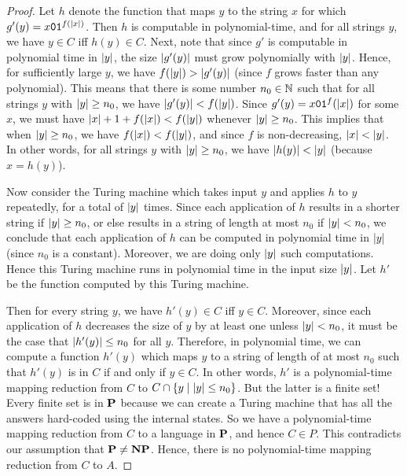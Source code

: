 \documentclass[11pt,twoside=off,numbers=noenddot]{scrbook}
\begin{document}
\begin{proof}
  Let $h$ denote the function that maps $y$ to the string $x$ for which $g'(y) = x\texttt{0}\texttt{1}^{f(| x |)}$. Then $h$ is computable in polynomial-time, and for all strings $y$, we have $y \in C$ iff $h(y) \in C$. Next, note that since $g'$ is computable in polynomial time in $| y |$, the size $| g'(y) |$ must grow polynomially with $| y |$. Hence, for sufficiently large $y$, we have $f(| y |) > | g'(y) |$ (since $f$ grows faster than any polynomial). This means that there is some number $n_0 \in \mathbb N$ such that for all strings $y$ with $| y | \geq n_0$, we have $| g'(y) | < f(| y |)$. Since $g'(y) = x\texttt{0}\texttt{1}^f(| x |)$ for some $x$, we must have $| x | + 1 + f(| x |) < f(| y |)$ whenever $| y | \geq n_0$. This implies that when $| y | \geq n_0$, we have $f(| x |) < f(| y |)$, and since $f$ is non-decreasing, $| x | < | y |$. In other words, for all strings $y$ with $| y | \geq n_0$, we have $| h(y) | < | y |$ (because $x = h(y)$).

  Now consider the Turing machine which takes input $y$ and applies $h$ to $y$ repeatedly, for a total of $| y |$ times. Since each application of $h$ results in a shorter string if $| y | \geq n_0$, or else results in a string of length at most $n_0$ if $| y | < n_0$, we conclude that each application of $h$ can be computed in polynomial time in $| y |$ (since $n_0$ is a constant). Moreover, we are doing only $| y |$ such computations. Hence this Turing machine runs in polynomial time in the input size $| y |$. Let $h'$ be the function computed by this Turing machine.

  Then for every string $y$, we have $h'(y) \in C$ iff $y \in C$. Moreover, since each application of $h$ decreases the size of $y$ by at least one unless $| y | < n_0$, it must be the case that $| h'(y) | \leq n_0$ for all $y$. Therefore, in polynomial time, we can compute a function $h'(y)$ which maps $y$ to a string of length of at most $n_0$ such that $h'(y)$ is in $C$ if and only if $y \in C$. In other words, $h'$ is a polynomial-time mapping reduction from $C$ to $C \cap \{ y \mid | y | \leq n_0 \}$. But the latter is a finite set! Every finite set is in $\textbf{P}$ because we can create a Turing machine that has all the answers hard-coded using the internal states. So we have a polynomial-time mapping reduction from $C$ to a language in $\textbf{P}$, and hence $C \in P$. This contradicts our assumption that $\textbf{P} \neq \textbf{NP}$. Hence, there is no polynomial-time mapping reduction from $C$ to $A$.
\end{proof}
\end{document}
